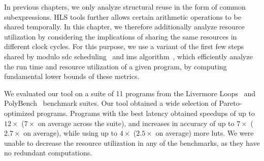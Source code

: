 In previous chapters, we only analyze structural reuse in the form of common
subexpressions.  HLS tools further allows certain arithmetic operations to be
shared temporally.  In this chapter, we therefore additionally analyze resource
utilization by considering the implications of sharing the same resources in
different clock cycles.  For this purpose, we use a variant of the first few
steps shared by modulo \gls{sdc} scheduling~\cite{canis14} and \acrfull{ims}
algorithm~\cite{rau94}, which efficiently analyze the run time and resource
utilization of a given program, by computing fundamental lower bounds of these
metrics.

We evaluated our tool on a suite of 11 programs from the Livermore
Loops~\cite{livermore} and PolyBench~\cite{polybench} benchmark suites.  Our
tool obtained a wide selection of Pareto-optimized programs.  Programs with
the best latency obtained speedups of up to $12\times$ ($7\times$ on average
across the suite), and increases in accuracy of up to $7\times$ ($2.7\times$
on average), while using up to $4\times$ ($2.5\times$ on average) more
\glspl{lut}.  We were unable to decrease the resource utilization in any of the
benchmarks, as they have no redundant computations.

